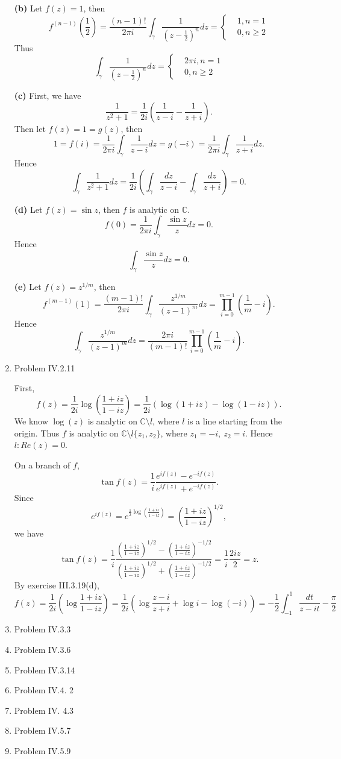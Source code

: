 \documentclass{article}%
\begin{document}
\begin{enumerate}
\textbf{(b)}
Let $f(z) = 1$, then 
$$
f^{(n-1)}(\frac{1}{2}) = \frac{(n-1)!}{2\pi i}\int_{\gamma}\frac{1}{(z-\frac{1}{2})^n} dz = \left\{
\begin{aligned}
& 1, n = 1 \\
& 0, n \ge 2
\end{aligned}
\right.
$$
Thus
$$
\int_{\gamma}\frac{1}{(z-\frac{1}{2})^n} dz = \left\{
\begin{aligned}
& 2\pi i, n = 1 \\
& 0, n \ge 2
\end{aligned}
\right.
$$

\textbf{(c)}
First, we have
$$
\frac{1}{z^2+1} = \frac{1}{2i}(\frac{1}{z-i}-\frac{1}{z+i}).
$$
Then let $f(z) = 1 = g(z)$, then
$$
1 = f(i) = \frac{1}{2\pi i}\int_{\gamma}\frac{1}{z-i}dz = g(-i) = \frac{1}{2\pi i}\int_{\gamma}\frac{1}{z+i}dz.
$$
Hence 
$$
\int_{\gamma}\frac{1}{z^2+1}dz = \frac{1}{2i}(\int_\gamma\frac{dz}{z-i}-\int_\gamma\frac{dz}{z+i}) = 0.
$$

\textbf{(d)}
Let $f(z) = \sin z$, then $f$ is analytic on $\mathbb{C}$.
$$
f(0) = \frac{1}{2\pi i}\int_{\gamma}\frac{\sin z}{z}dz = 0.
$$
Hence
$$
\int_\gamma \frac{\sin z}{z}dz = 0.
$$

\textbf{(e)}
Let $f(z) = z^{1/m} $, then
$$
f^{(m-1)}(1) = \frac{(m-1)!}{2\pi i}\int_{\gamma}\frac{z^{1/m}}{(z-1)^m}dz = \prod_{i=0}^{m-1}(\frac{1}{m}-i).
$$
Hence
$$
\int_{\gamma}\frac{z^{1/m}}{(z-1)^m}dz  = \frac{2\pi i}{(m-1)!}\prod_{i=0}^{m-1}(\frac{1}{m}-i).
$$


\item Problem IV.2.11

First, 
$$
f(z) = \frac{1}{2i}\log(\frac{1+iz}{1-iz}) = \frac{1}{2i}(\log(1+iz)-\log(1-iz)).
$$
We know $\log(z)$ is analytic on $\mathbb{C}\setminus l$, where $l$ is a line starting from the origin. Thus $f$ is analytic on $\mathbb{C}\setminus l\{z_1, z_2\}$, where $z_1 = -i, ~z_2 = i $. Hence $l: Re(z) = 0 $.

On a branch of $f$, 
$$
\tan f(z) = \frac{1}{i}\frac{e^{if(z)}-e^{-if(z)}}{e^{if(z)}+e^{-if(z)}}.
$$
Since
$$
e^{if(z)} = e^{\frac{1}{2}\log(\frac{1+iz}{1-iz})} = (\frac{1+iz}{1-iz})^{1/2},
$$
we have
$$
\tan f(z) = \frac{1}{i}\frac{(\frac{1+iz}{1-iz})^{1/2}-(\frac{1+iz}{1-iz})^{-1/2}}{(\frac{1+iz}{1-iz})^{1/2}+(\frac{1+iz}{1-iz})^{-1/2}} = \frac{1}{i}\frac{2iz}{2} = z.
$$
By exercise III.3.19(d),
$$
f(z) = \frac{1}{2i}(\log\frac{1+iz}{1-iz}) = \frac{1}{2i}(\log\frac{z-i}{z+i}+\log i-\log (-i)) = -\frac{1}{2}\int_{-1}^{1}\frac{dt}{z-it} - \frac{\pi}{2}
$$


\item Problem IV.3.3

\item Problem IV.3.6

\item Problem IV.3.14

\item Problem IV.4. 2

\item Problem IV. 4.3

\item Problem IV.5.7

\item Problem IV.5.9


\end{enumerate}
\end{document}
